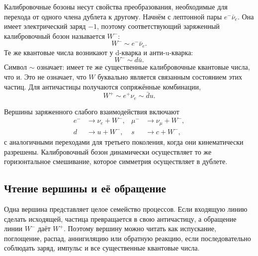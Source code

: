 Калибровочные бозоны несут свойства преобразования, необходимые для перехода от одного члена дублета к другому. Начнём с лептонной пары
\(e^-\bar\nu_e\). Она имеет электрический заряд \(-1\), поэтому соответствующий заряженный калибровочный бозон называется \(W^-\):
\begin{equation}
W^-\sim e^-\bar\nu_e.
\end{equation}
Те же квантовые числа возникают у d-кварка и анти-u-кварка:
\begin{equation}
W^-\sim d\bar u.
\end{equation}
Символ \(\sim\) означает: имеет те же существенные калибровочные квантовые числа, что и.
Это не означает, что \(W\) буквально является связанным состоянием этих частиц.
Для античастицы получаются сопряжённые комбинации,
\begin{equation}
W^+\sim e^+\nu_e\sim\bar d u.
\end{equation}

Вершины заряженного слабого взаимодействия включают
\begin{align}
e^-&\longrightarrow\nu_e+W^-,
&
\mu^-&\longrightarrow\nu_\mu+W^-,
\label{eq:l5-lepton-w}\\
d&\longrightarrow u+W^-,
&
s&\longrightarrow c+W^-,
\label{eq:l5-quark-w}
\end{align}
с аналогичными переходами для третьего поколения, когда они кинематически разрешены. Калибровочный бозон динамически осуществляет то же горизонтальное смешивание, которое симметрия осуществляет в дублете.

\begin{classroomqa}
\end{classroomqa}

\subsection{Чтение вершины и её обращение}

Одна вершина представляет целое семейство процессов. Если входящую линию
сделать исходящей, частица превращается в свою античастицу, а обращение линии
\(W^-\) даёт \(W^+\). Поэтому вершину можно читать как испускание,
поглощение, распад, аннигиляцию или обратную реакцию, если последовательно
соблюдать заряд, импульс и все существенные квантовые числа.

